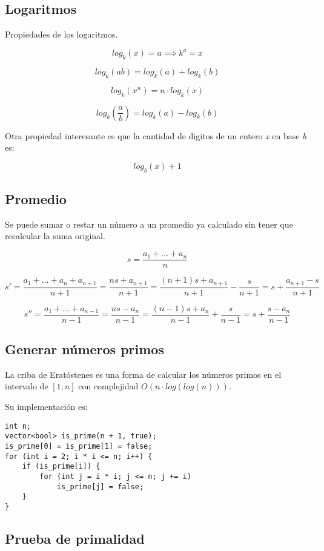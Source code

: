 \documentclass[11pt]{article}
\begin{document}
\subsection{Logaritmos}

Propiedades de los logaritmos.

\[ log_k(x) = a \implies k^a = x \]

\[ log_k(ab) = log_k(a) + log_k(b) \]

\[ log_k(x^n) = n \cdot log_k(x) \]

\[ log_k(\frac{a}{b}) = log_k(a) - log_k(b) \]

Otra propiedad interesante es que la cantidad de digitos de un entero \textit{x} en base \textit{b} es:

\[ log_b(x) + 1 \]

\subsection{Promedio}

Se puede sumar o restar un número a un promedio ya calculado sin tener que recalcular la suma original.

\[ s = \frac{a_1 + \dots + a_n}{n} \]

\[ s' = \frac{a_1 + \dots + a_n + a_{n + 1}}{n + 1} = \frac{ns + a_{n + 1}}{n + 1} = \frac{(n + 1)s + a_{n + 1}}{n + 1} - \frac{s}{n + 1} = s + \frac{a_{n + 1} - s}{n + 1} \]

\[ s'' = \frac{a_1 + \dots + a_{n - 1}}{n - 1} = \frac{ns - a_{n}}{n - 1} = \frac{(n - 1)s + a_{n}}{n - 1} + \frac{s}{n - 1} = s + \frac{s - a_{n}}{n - 1} \]

\subsection{Generar números primos}

La criba de Eratóstenes es una forma de calcular los números primos en el intervalo de $[1 ; n]$ con complejidad $O(n \cdot log(log(n)))$.

Su implementación es:

\begin{lstlisting}
int n;
vector<bool> is_prime(n + 1, true);
is_prime[0] = is_prime[1] = false;
for (int i = 2; i * i <= n; i++) {
    if (is_prime[i]) {
        for (int j = i * i; j <= n; j += i)
            is_prime[j] = false;
    }
}
\end{lstlisting}

\subsection{Prueba de primalidad}
\end{document}
